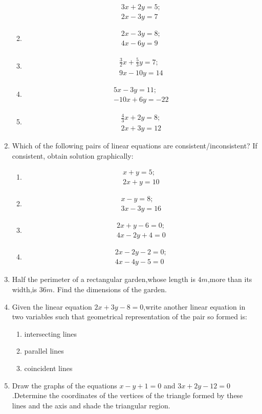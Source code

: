 \documentclass{article}
\theoremstyle{remark}
\begin{document}
\begin{enumerate}
\begin{enumerate}[label=(\roman*)]
\begin{align}
       		3x+2y=5; \\
      		2x-3y=7
    	       \end{align} 
	\item \begin{align}
		2x-3y=8;\\
		4x-6y=9
		\end{align}
	\item \begin{align}
		\frac{3}{2}x+\frac{5}{3}y=7;\\
		9x-10y=14
		\end{align}
\item \begin{align}
		5x-3y=11;\\
		-10x+6y=-22
	\end{align}
\item \begin{align}
         \frac{4}{3}x+2y=8;\\
	  2x+3y=12
	\end{align}
\end{enumerate}
\item Which of the following pairs of linear equations are consistent/inconsistent? If consistent, obtain solution graphically:
\begin{enumerate}[label=(\roman*)]
\item \begin{align}
	x+y=5;\\
	2x+y=10
	\end{align}
\item \begin{align}
	x-y=8;\\
	3x-3y=16
	\end{align}
\item \begin{align}
 	2x+y-6=0;\\
 	4x-2y+4=0
	\end{align}
\item \begin{align}
	2x-2y-2=0;\\
	4x-4y-5=0
	\end{align}
\end{enumerate}
\item Half the perimeter of a rectangular garden,whose length is $4m$,more than its width,is $36m$. Find the dimensions of the garden.
\item Given the linear equation $2x+3y-8=0$,write another linear equation in two variables such that geometrical representation of the pair so formed is:
\begin{enumerate}[label=(\roman*)]
\item intersecting lines
\item parallel lines
\item coincident lines
\end{enumerate}
\item Draw the graphs of the equations $x-y+1=0$ and $3x+2y-12=0$.Determine the coordinates of the vertices of the triangle formed by these lines and the axis and shade the triangular region.
\end{enumerate}
\end{document}
